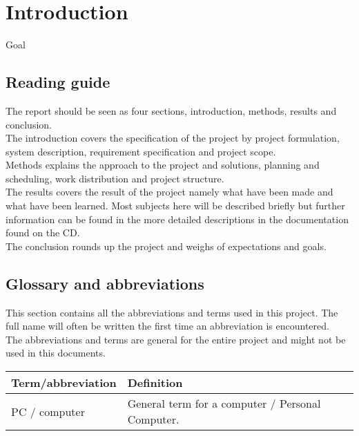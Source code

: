 \chapter{Introduction}
Goal

\section{Reading guide}
The report should be seen as four sections, introduction, methods, results and conclusion.\\
The introduction covers the specification of the project by project formulation, system description, requirement specification and project scope.\\
Methods explains the approach to the project and solutions, planning and scheduling, work distribution and project structure.\\
The results covers the result of the project namely what have been made and what have been learned. Most subjects here will be described briefly but further information can be found in the more detailed descriptions in the documentation found on the CD.\\
The conclusion rounds up the project and weighs of expectations and goals.

\section{Glossary and abbreviations}
This section contains all the abbreviations and terms used in this project. The full name will often be written the first time an abbreviation is encountered.\\
The abbreviations and terms are general for the entire project and might not be used in this documents.
\begin{table}[H]
\centering
\begin{tabular}{|p{4cm}|p{7cm}|}
\hline
Term/abbreviation & Definition\\ \hline
PC / computer & General term for a computer / Personal Computer.\\ \hline
\end{tabular}
\end{table}
